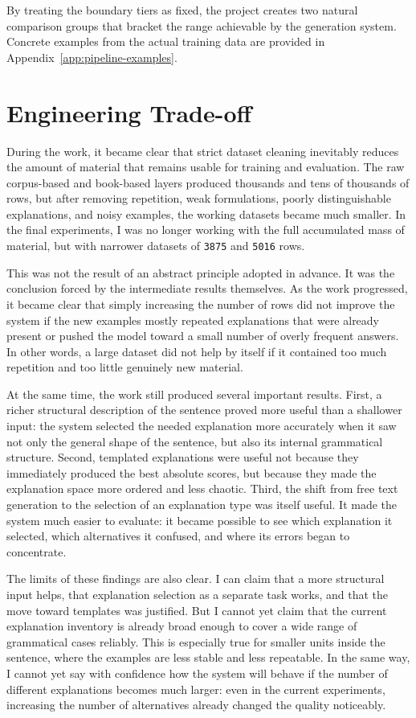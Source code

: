 \documentclass[12pt,a4paper,oneside]{report}
\begin{document}
By treating the boundary tiers as fixed, the project creates two natural comparison groups that bracket the range achievable by the generation system. Concrete examples from the actual training data are provided in Appendix~\ref{app:pipeline-examples}.

\section{Engineering Trade-off}
During the work, it became clear that strict dataset cleaning inevitably reduces the amount of material that remains usable for training and evaluation. The raw corpus-based and book-based layers produced thousands and tens of thousands of rows, but after removing repetition, weak formulations, poorly distinguishable explanations, and noisy examples, the working datasets became much smaller. In the final experiments, I was no longer working with the full accumulated mass of material, but with narrower datasets of \texttt{3875} and \texttt{5016} rows.

This was not the result of an abstract principle adopted in advance. It was the conclusion forced by the intermediate results themselves. As the work progressed, it became clear that simply increasing the number of rows did not improve the system if the new examples mostly repeated explanations that were already present or pushed the model toward a small number of overly frequent answers. In other words, a large dataset did not help by itself if it contained too much repetition and too little genuinely new material.

At the same time, the work still produced several important results. First, a richer structural description of the sentence proved more useful than a shallower input: the system selected the needed explanation more accurately when it saw not only the general shape of the sentence, but also its internal grammatical structure. Second, templated explanations were useful not because they immediately produced the best absolute scores, but because they made the explanation space more ordered and less chaotic. Third, the shift from free text generation to the selection of an explanation type was itself useful. It made the system much easier to evaluate: it became possible to see which explanation it selected, which alternatives it confused, and where its errors began to concentrate.

The limits of these findings are also clear. I can claim that a more structural input helps, that explanation selection as a separate task works, and that the move toward templates was justified. But I cannot yet claim that the current explanation inventory is already broad enough to cover a wide range of grammatical cases reliably. This is especially true for smaller units inside the sentence, where the examples are less stable and less repeatable. In the same way, I cannot yet say with confidence how the system will behave if the number of different explanations becomes much larger: even in the current experiments, increasing the number of alternatives already changed the quality noticeably.
\end{document}
